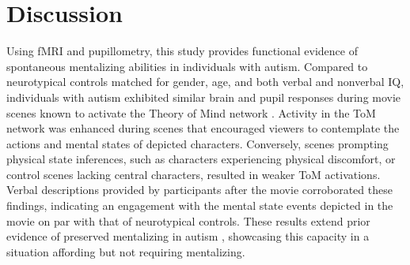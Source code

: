 



\section{Discussion}
Using fMRI and pupillometry, this study provides functional evidence of spontaneous mentalizing abilities in individuals with autism. Compared to neurotypical controls matched for gender, age, and both verbal and nonverbal IQ, individuals with autism exhibited similar brain and pupil responses during movie scenes known to activate the Theory of Mind network \citep{jacoby2016,richardson2018}. Activity in the ToM network was enhanced during scenes that encouraged viewers to contemplate the actions and mental states of depicted characters. Conversely, scenes prompting physical state inferences, such as characters experiencing physical discomfort, or control scenes lacking central characters, resulted in weaker ToM activations. Verbal descriptions provided by participants after the movie corroborated these findings, indicating an engagement with the mental state events depicted in the movie on par with that of neurotypical controls. These results extend prior evidence of preserved mentalizing in autism \citep{moessnang2020,dufour2013}, showcasing this capacity in a situation affording but not requiring mentalizing.

